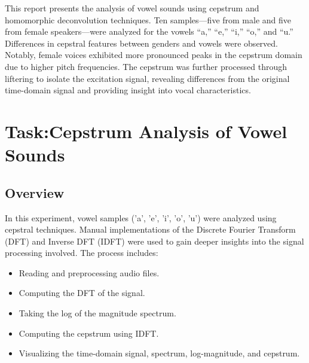 \documentclass[a4paper,12pt]{article}
\begin{document}
This report presents the analysis of vowel sounds using cepstrum and homomorphic deconvolution techniques. Ten samples—five from male and five from female speakers—were analyzed for the vowels “a,” “e,” “i,” “o,” and “u.” Differences in cepstral features between genders and vowels were observed. Notably, female voices exhibited more pronounced peaks in the cepstrum domain due to higher pitch frequencies. The cepstrum was further processed through liftering to isolate the excitation signal, revealing differences from the original time-domain signal and providing insight into vocal characteristics.

\section{Task:Cepstrum Analysis of Vowel Sounds}

\subsection{Overview}

In this experiment, vowel samples ('a', 'e', 'i', 'o', 'u') were analyzed using cepstral techniques. Manual implementations of the Discrete Fourier Transform (DFT) and Inverse DFT (IDFT) were used to gain deeper insights into the signal processing involved. The process includes:
\begin{itemize}
    \item Reading and preprocessing audio files.
    \item Computing the DFT of the signal.
    \item Taking the log of the magnitude spectrum.
    \item Computing the cepstrum using IDFT.
    \item Visualizing the time-domain signal, spectrum, log-magnitude, and cepstrum.
\end{itemize}
\end{document}
